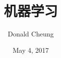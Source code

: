\documentclass[11pt,a4paper]{book}
\begin{document}
\setlength{\baselineskip}{20pt}
\title{机器学习}
\author{Donald Cheung}
\date{May 4, 2017}
\maketitle
\tableofcontents


\end{document}
